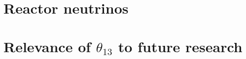 \documentclass[../thesis.tex]{subfiles}
\begin{document}
\section{Reactor neutrinos}
\label{sec:introReactor}

\section{Relevance of $\theta_{13}$ to future research}
\label{sec:futureRelevance}
\end{document}
